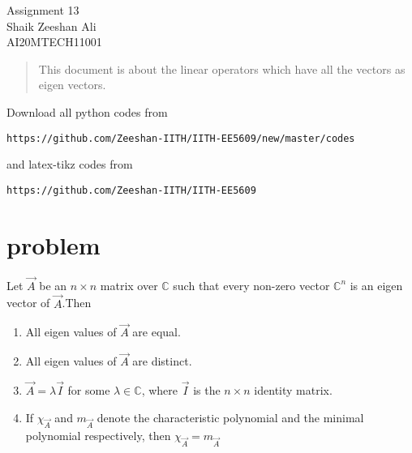 \documentclass[journal,12pt]{IEEEtran}
\begin{document}
\renewcommand{\thefigure}{\theproblem}
\def\putbox#1#2#3{\makebox[0in][l]{\makebox[#1][l]{}\raisebox{\baselineskip}[0in][0in]{\raisebox{#2}[0in][0in]{#3}}}}
     \def\rightbox#1{\makebox[0in][r]{#1}}
     \def\centbox#1{\makebox[0in]{#1}}
     \def\topbox#1{\raisebox{-\baselineskip}[0in][0in]{#1}}
     \def\midbox#1{\raisebox{-0.5\baselineskip}[0in][0in]{#1}}
\vspace{3cm}
\begin{center}
\huge Assignment 13\\
\large Shaik Zeeshan Ali\\
\large AI20MTECH11001\\
\end{center}
\begin{abstract}
This document is about the linear operators which have all the vectors as eigen vectors.
\end{abstract}
Download all python codes from 
\begin{lstlisting}
https://github.com/Zeeshan-IITH/IITH-EE5609/new/master/codes
\end{lstlisting}
and latex-tikz codes from 
\begin{lstlisting}
https://github.com/Zeeshan-IITH/IITH-EE5609
\end{lstlisting}
\section{problem}
Let $\vec{A}$ be an $n\times n$ matrix over $\mathbb{C}$ such that every non-zero vector $\mathbb{C}^n$ is an eigen vector of $\vec{A}$.Then
\begin{enumerate}
    \item All eigen values of $\vec{A}$ are equal.
    \item All eigen values of $\vec{A}$ are distinct.
    \item $\vec{A}=\lambda\vec{I}$ for some $\lambda \in \mathbb{C}$, where $\vec{I}$ is the $n\times n$ identity matrix.
    \item If $\chi_\vec{A}$ and $m_\vec{A}$ denote the characteristic polynomial and the minimal polynomial respectively, then $\chi_\vec{A}=m_\vec{A}$
\end{enumerate}
\end{document}
